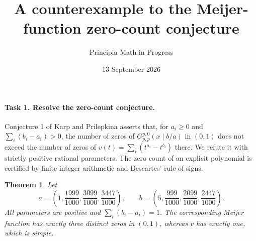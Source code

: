 \documentclass[10pt]{article}
\title{A counterexample to the Meijer-function zero-count conjecture}
\author{Principia Math in Progress}
\date{13 September 2026}
\newtheorem{theorem}{Theorem}
\begin{document}
\maketitle

\paragraph{Task 1. Resolve the zero-count conjecture.}
Conjecture 1 of Karp and Prilepkina \cite{KP} asserts that, for
\(a_i\ge0\) and \(\sum_i(b_i-a_i)>0\), the number of zeros of
\(G^{p,0}_{p,p}(x\mid b/a)\) in \((0,1)\) does not exceed the
number of zeros of \(v(t)=\sum_i(t^{a_i}-t^{b_i})\) there.
We refute it with strictly positive rational parameters.
The zero count of an explicit polynomial is certified by finite
integer arithmetic and Descartes' rule of signs.

\begin{theorem}
Let
\[
 a=\left(1,\frac{1999}{1000},\frac{3099}{1000},\frac{3447}{1000}\right),
 \qquad
 b=\left(5,\frac{999}{1000},\frac{2099}{1000},\frac{2447}{1000}\right).
\]
All parameters are positive and \(\sum_i(b_i-a_i)=1\).
The corresponding Meijer function has exactly three distinct
zeros in \((0,1)\), whereas \(v\) has exactly one, which is simple.
\end{theorem}
\end{document}
